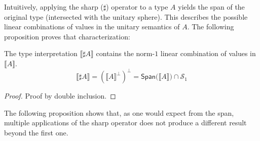 \documentclass[runningheads,orivec]{llncs}
\providecommand{\qed}{\hbox{\rule{1ex}{1ex}}}%
\newcommand{\qedhere}{%
  \ifmmode
    \tag*{\qed}%
  \else
    \hfill\qed%
  \fi
}
\newcommand\Span[1]{\ensuremath{{\mathsf{Span}}{#1}}}
\def\Sph{\mathcal{S}_1}       %
\def\scal#1#2{\langle{#1}~|~{#2}\rangle}
\def\sem#1{\llbracket#1\rrbracket}
\begin{document}
Intuitively, applying the sharp ($\sharp$) operator to a type $A$ yields the span of the original type (intersected with the unitary sphere). This describes the possible linear combinations of values in the unitary semantics of $A$. The following proposition proves that characterization:

\begin{proposition}\label{prop:SharpCharacterization}
  The type interpretation $\sem{\sharp A}$ contains the norm-$1$ linear combination of values in $\sem{A}$.
  \[
  \sem{\sharp A} = (\sem{A}^\bot)^\bot = \Span(\sem{A})\cap\Sph
  \]
\end{proposition}

\begin{proof}
  Proof by double inclusion.
\end{proof}

The following proposition shows that, as one would expect from the span, multiple applications of the sharp operator does not produce a different result beyond the first one.   
\end{document}
